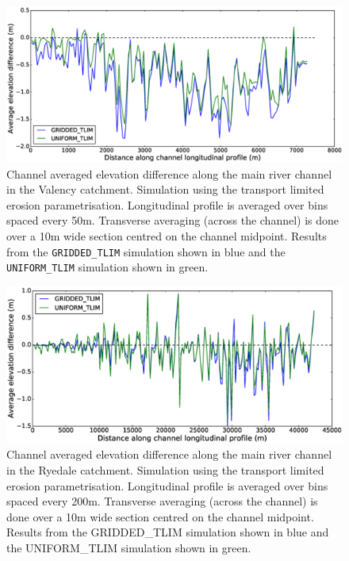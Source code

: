 \begin{figure}[htb]
\includegraphics[width=14cm]{chp06_figures_scripts/fig_swath_profile_boscastle_erode_tlim.eps}
\caption{Channel averaged elevation difference along the main river channel in the Valency catchment. Simulation using the transport limited erosion parametrisation. Longitudinal profile is averaged over bins spaced every 50m. Transverse averaging (across the channel) is done over a 10m wide section centred on the channel midpoint. Results from the \texttt{GRIDDED\_TLIM} simulation shown in blue and the \texttt{UNIFORM\_TLIM} simulation shown in green.}
\label{fig_boscastle_swath_tlim}
\end{figure}

\begin{figure}[htb]
\includegraphics[width=14cm]{chp06_figures_scripts/fig_swath_profile_ryedale_erode_tlim.eps}
\caption{Channel averaged elevation difference along the main river channel in the Ryedale catchment. Simulation using the transport limited erosion parametrisation. Longitudinal profile is averaged over bins spaced every 200m. Transverse averaging (across the channel) is done over a 10m wide section centred on the channel midpoint. Results from the GRIDDED\_TLIM simulation shown in blue and the UNIFORM\_TLIM simulation shown in green.}
\label{fig_ryedale_swath_tlim}
\end{figure}

